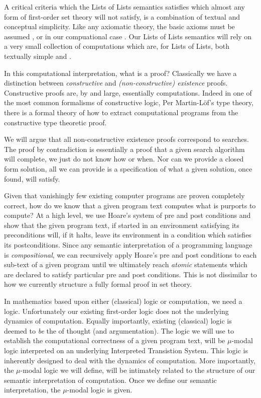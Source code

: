 A critical criteria which the Lists of Lists semantics satisfies which 
almost any form of first-order set theory will not satisfy, is a 
combination of textual and conceptual simplicity. Like any axiomatic 
theory, the basic axioms must be assumed , or in our 
compuational case . Our Lists of Lists 
semantics will rely on a very small collection of computations which are, 
for Lists of Lists, both textually simple and . 

In this computational interpretation, what is a proof? Classically we have 
a distinction between \emph{constructive} and \emph{(non-constructive) 
existence} proofs. Constructive proofs are, by and large, essentially 
computations. Indeed in one of the most common formalisms of constructive 
logic, Per Martin-L\"of's type theory, there is a formal theory of how to 
extract computational programs from the constructive type theoretic proof. 

We will argue that all non-constructive existence proofs correspond to 
searches. The proof by contradiction is essentially a proof that a given 
search algorithm will complete, we just do not know how or when. Nor can 
we provide a closed form solution, all we can provide is a specification 
of what a given solution, once found, will satisfy. 

Given that vanishingly few existing computer programs are proven 
completely correct, how do we know that a given program text computes what 
is purports to compute? At a high level, we use Hoare's system of pre and 
post conditions and show that the given program text, if started in an 
environment satisfying its preconditions will, if it halts, leave its 
environment in a condition which satisfies its postconditions. Since any 
semantic interpretation of a programming language is \emph{compositional}, 
we can recursively apply Hoare's pre and post conditions to each sub-text 
of a given program until we ultimately reach \emph{atomic} statements 
which are declared to satisfy particular pre and post conditions. This is 
not dissimilar to how we currently structure a fully formal proof in set 
theory. 

In mathematics based upon either (classical) logic or computation, we need 
a logic. Unfortunately our existing first-order logic does not  the underlying dynamics of computation. Equally importantly, 
existing (classical) logic is deemed to \emph{be} the  of 
 thought (and argumentation). The logic we will use to 
establish the computational correctness of a given program text, will be 
$\mu$-modal logic interpreted on an underlying Interpreted Transistion 
System. This logic is inherently designed to deal with the dynamics of 
computation. More importantly, the $\mu$-modal logic we will define, will 
be intimately related to the structure of our semantic interpretation of 
computation. Once we define our semantic interpretation, the $\mu$-modal 
logic is given. 

